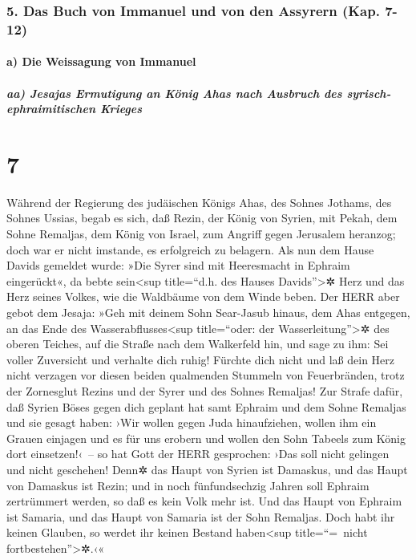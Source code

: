 \hypertarget{das-buch-von-immanuel-und-von-den-assyrern-kap.-7-12}{%
\subsubsection{5. Das Buch von Immanuel und von den Assyrern (Kap.
7-12)}\label{das-buch-von-immanuel-und-von-den-assyrern-kap.-7-12}}

\hypertarget{a-die-weissagung-von-immanuel}{%
\paragraph{a) Die Weissagung von
Immanuel}\label{a-die-weissagung-von-immanuel}}

\hypertarget{aa-jesajas-ermutigung-an-kuxf6nig-ahas-nach-ausbruch-des-syrisch-ephraimitischen-krieges}{%
\subparagraph{aa) Jesajas Ermutigung an König Ahas nach Ausbruch des
syrisch-ephraimitischen
Krieges}\label{aa-jesajas-ermutigung-an-kuxf6nig-ahas-nach-ausbruch-des-syrisch-ephraimitischen-krieges}}

\hypertarget{section-6}{%
\section{7}\label{section-6}}

Während der Regierung des judäischen Königs Ahas, des
Sohnes Jothams, des Sohnes Ussias, begab es sich, daß Rezin, der König
von Syrien, mit Pekah, dem Sohne Remaljas, dem König von Israel, zum
Angriff gegen Jerusalem heranzog; doch war er nicht imstande, es
erfolgreich zu belagern. Als nun dem Hause Davids gemeldet
wurde: »Die Syrer sind mit Heeresmacht in Ephraim eingerückt«, da bebte
sein\textless sup title=``d.h. des Hauses Davids''\textgreater✲ Herz und
das Herz seines Volkes, wie die Waldbäume von dem Winde beben.
Der HERR aber gebot dem Jesaja: »Geh mit deinem Sohn
Sear-Jasub hinaus, dem Ahas entgegen, an das Ende des
Wasserabflusses\textless sup title=``oder: der
Wasserleitung''\textgreater✲ des oberen Teiches, auf die Straße nach dem
Walkerfeld hin, und sage zu ihm: Sei voller Zuversicht und
verhalte dich ruhig! Fürchte dich nicht und laß dein Herz nicht verzagen
vor diesen beiden qualmenden Stummeln von Feuerbränden, trotz der
Zornesglut Rezins und der Syrer und des Sohnes Remaljas!
Zur Strafe dafür, daß Syrien Böses gegen dich geplant hat
samt Ephraim und dem Sohne Remaljas und sie gesagt haben:
›Wir wollen gegen Juda hinaufziehen, wollen ihm ein Grauen
einjagen und es für uns erobern und wollen den Sohn Tabeels zum König
dort einsetzen!‹~-- so hat Gott der HERR gesprochen: ›Das
soll nicht gelingen und nicht geschehen! Denn✲ das Haupt
von Syrien ist Damaskus, und das Haupt von Damaskus ist Rezin; und in
noch fünfundsechzig Jahren soll Ephraim zertrümmert werden, so daß es
kein Volk mehr ist. Und das Haupt von Ephraim ist Samaria,
und das Haupt von Samaria ist der Sohn Remaljas. Doch habt ihr keinen
Glauben, so werdet ihr keinen Bestand haben\textless sup title=``=~nicht
fortbestehen''\textgreater✲.‹«

